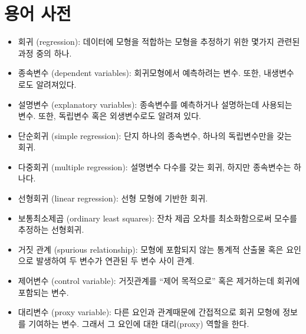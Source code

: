 \section{용어 사전}

\begin{itemize}

\item 회귀 (regression): 데이터에 모형을 적합하는 모형을 추정하기 위한 몇가지 관련된 과정 중의 하나.

\item 종속변수 (dependent variables): 회귀모형에서 예측하려는 변수. 또한, 내생변수로도 알려져있다.

\item 설명변수 (explanatory variables): 종속변수를 예측하거나 설명하는데 사용되는 변수. 또한, 독립변수 혹은 외생변수로도 알려져 있다.

\item 단순회귀 (simple regression): 단지 하나의 종속변수, 하나의 독립변수만을 갖는 회귀.

\item 다중회귀 (multiple regression): 설명변수 다수를 갖는 회귀, 하지만 종속변수는 하나다.

\item 선형회귀 (linear regression): 선형 모형에 기반한 회귀.

\item 보통최소제곱 (ordinary least squares): 잔차 제곱 오차를 최소화함으로써 모수를 추정하는 선형회귀.

\item 거짓 관계 (spurious relationship): 
모형에 포함되지 않는 통계적 산출물 혹은 요인으로 발생하여 두 변수가 연관된 두 변수 사이 관계. 

\item 제어변수 (control variable): 거짓관계를 ``제어 목적으로'' 혹은 제거하는데 회귀에 포함되는 변수.

\item 대리변수 (proxy variable): 다른 요인과 관계때문에 간접적으로 회귀 모형에 정보를 기여하는 변수. 그래서 그 요인에 대한 대리(proxy) 역할을 한다.


\end{itemize}
